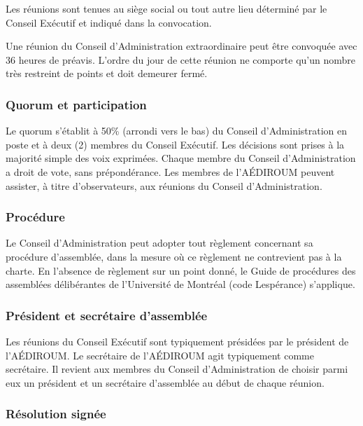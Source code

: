 \documentclass{aediroum}
\begin{document}
Les réunions sont tenues au siège social ou tout autre lieu déterminé par le Conseil Exécutif et indiqué dans la convocation.

Une réunion du Conseil d'Administration extraordinaire peut être convoquée avec 36 heures de préavis. L'ordre du jour de cette réunion ne comporte qu'un nombre très restreint de points et doit demeurer fermé.

\subsubsection{Quorum et participation}\label{sec:quorum-et-participation}

Le quorum s'établit à 50\% (arrondi vers le bas) du Conseil d'Administration en poste et à deux (2) membres du Conseil Exécutif. Les décisions sont prises à la majorité simple des voix exprimées. Chaque membre du Conseil d'Administration a droit de vote, sans prépondérance. Les membres de l'AÉDIROUM peuvent assister, à titre d'observateurs, aux réunions du Conseil d'Administration.

\subsubsection{Procédure}\label{sec:procedure-admin}

Le Conseil d'Administration peut adopter tout règlement concernant sa procédure d'assemblée, dans la mesure où ce règlement ne contrevient pas à la charte. En l'absence de règlement sur un point donné, le Guide de procédures des assemblées délibérantes de l'Université de Montréal (code Lespérance) s'applique.

\subsubsection{Président et secrétaire d'assemblée}\label{sec:president-et-secretaire-dassemblee}

Les réunions du Conseil Exécutif sont typiquement présidées par le président de l'AÉDIROUM. Le secrétaire de l'AÉDIROUM agit typiquement comme secrétaire. Il revient aux membres du Conseil d'Administration de choisir parmi eux un président et un secrétaire d'assemblée au début de chaque réunion.

\subsubsection{Résolution signée}\label{sec:resolution-signee}
\end{document}

